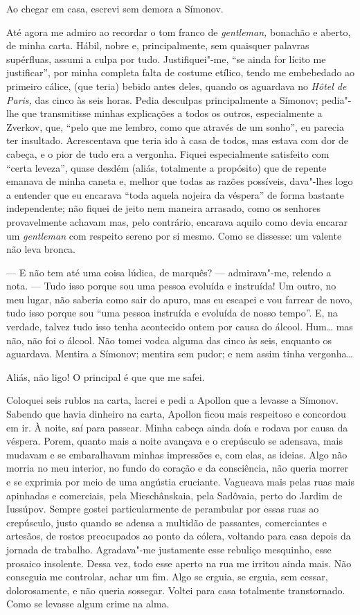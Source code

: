 Ao chegar em casa, escrevi sem demora a Símonov.

Até agora me admiro ao recordar o tom franco de \emph{gentleman,}
bonachão e aberto, de minha carta. Hábil, nobre e, principalmente, sem
quaisquer palavras supérfluas, assumi a culpa por tudo. Justifiquei"-me,
``se ainda for lícito me justificar'', por minha completa falta de
costume etílico, tendo me embebedado ao primeiro cálice, (que teria)
bebido antes deles, quando os aguardava no \emph{Hôtel de Paris,} das
cinco às seis horas. Pedia desculpas principalmente a Símonov; pedia"-lhe
que transmitisse minhas explicações a todos os outros, especialmente a
Zverkov, que, ``pelo que me lembro, como que através de um sonho'', eu
parecia ter insultado. Acrescentava que teria ido à casa de todos, mas
estava com dor de cabeça, e o pior de tudo era a vergonha. Fiquei
especialmente satisfeito com ``certa leveza'', quase desdém (aliás,
totalmente a propósito) que de repente emanava de minha caneta e, melhor
que todas as razões possíveis, dava"-lhes logo a entender que eu encarava
``toda aquela nojeira da véspera'' de forma bastante independente; não
fiquei de jeito nem maneira arrasado, como os senhores provavelmente
achavam mas, pelo contrário, encarava aquilo como devia encarar um
\emph{gentleman} com respeito sereno por si mesmo. Como se dissesse: um
valente não leva bronca.

--- E não tem até uma coisa lúdica, de marquês? --- admirava"-me, relendo a
nota. --- Tudo isso porque sou uma pessoa evoluída e instruída! Um outro,
no meu lugar, não saberia como sair do apuro, mas eu escapei e vou
farrear de novo, tudo isso porque sou ``uma pessoa instruída e evoluída
de nosso tempo''. E, na verdade, talvez tudo isso tenha acontecido ontem
por causa do álcool. Hum\ldots{} mas não, não foi o álcool. Não tomei vodca
alguma das cinco às seis, enquanto os aguardava. Mentira a Símonov;
mentira sem pudor; e nem assim tinha vergonha\ldots{}

Aliás, não ligo! O principal é que que me safei.

Coloquei seis rublos na carta, lacrei e pedi a Apollon que a levasse a
Símonov. Sabendo que havia dinheiro na carta, Apollon ficou mais
respeitoso e concordou em ir. À noite, saí para passear. Minha cabeça
ainda doía e rodava por causa da véspera. Porem, quanto mais a noite
avançava e o crepúsculo se adensava, mais mudavam e se embaralhavam
minhas impressões e, com elas, as ideias. Algo não morria no meu
interior, no fundo do coração e da consciência, não queria morrer e se
exprimia por meio de uma angústia cruciante. Vagueava mais pelas ruas
mais apinhadas e comerciais, pela Mieschânskaia, pela Sadôvaia, perto do
Jardim de Iussúpov. Sempre gostei particularmente de perambular por
essas ruas ao crepúsculo, justo quando se adensa a multidão de
passantes, comerciantes e artesãos, de rostos preocupados ao ponto da
cólera, voltando para casa depois da jornada de trabalho. Agradava"-me
justamente esse rebuliço mesquinho, esse prosaico insolente. Dessa vez,
todo esse aperto na rua me irritou ainda mais. Não conseguia me
controlar, achar um fim. Algo se erguia, se erguia, sem cessar,
dolorosamente, e não queria sossegar. Voltei para casa totalmente
transtornado. Como se levasse algum crime na alma.

